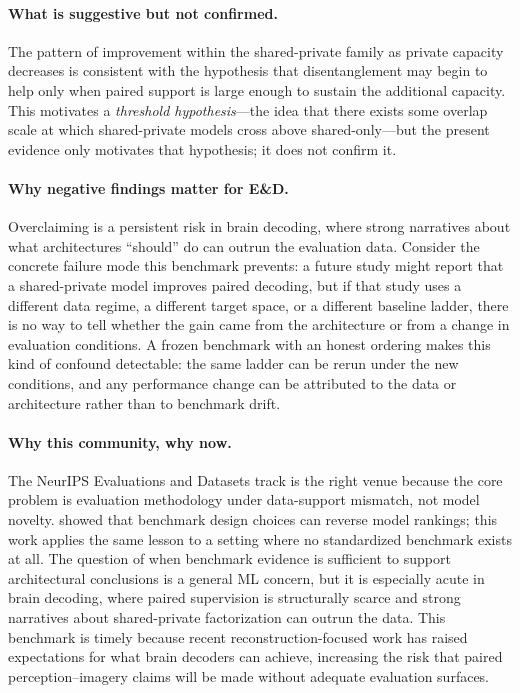 \documentclass{article}
\begin{document}
\paragraph{What is suggestive but not confirmed.}
The pattern of improvement within the shared-private family as private capacity
decreases is consistent with the hypothesis that disentanglement may begin to
help only when paired support is large enough to sustain the additional
capacity.  This motivates a \emph{threshold hypothesis}---the idea that there
exists some overlap scale at which shared-private models cross above
shared-only---but the present evidence only motivates that hypothesis; it does
not confirm it.

\paragraph{Why negative findings matter for E\&D.}
Overclaiming is a persistent risk in brain decoding, where strong narratives
about what architectures ``should'' do can outrun the evaluation data.  Consider
the concrete failure mode this benchmark prevents: a future study might report
that a shared-private model improves paired decoding, but if that study uses a
different data regime, a different target space, or a different baseline ladder,
there is no way to tell whether the gain came from the architecture or from a
change in evaluation conditions.  A frozen benchmark with an honest ordering
makes this kind of confound detectable: the same ladder can be rerun under the
new conditions, and any performance change can be attributed to the data or
architecture rather than to benchmark drift.

\paragraph{Why this community, why now.}
The NeurIPS Evaluations and Datasets track is the right venue because the core
problem is evaluation methodology under data-support mismatch, not model
novelty.  \citet{dehghani2021benchmark} showed that benchmark design choices
can reverse model rankings; this work applies the same lesson to a setting
where no standardized benchmark exists at all.  The question of when benchmark
evidence is sufficient to support architectural conclusions is a general ML
concern, but it is especially acute in brain decoding, where paired supervision
is structurally scarce and strong narratives about shared-private factorization
can outrun the data.  This benchmark is timely because recent
reconstruction-focused work
\citep{takagi2023high,ozcelik2023brain,scotti2024mindeye2} has raised
expectations for what brain decoders can achieve, increasing the risk that
paired perception--imagery claims will be made without adequate evaluation
surfaces.
\end{document}
